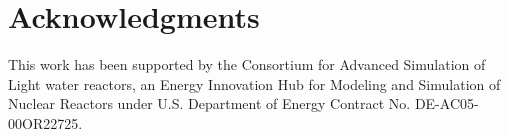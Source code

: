 \documentclass{mc2015}
\begin{document}
\section{Acknowledgments}

This work has been supported by the Consortium for Advanced Simulation of Light
water reactors, an Energy Innovation Hub for Modeling and
Simulation of Nuclear Reactors under U.S. Department of Energy Contract No.
DE-AC05-00OR22725.

\setlength{\baselineskip}{12pt}





\end{document}
